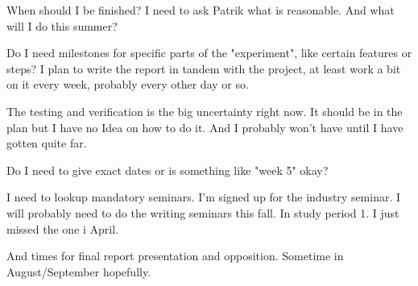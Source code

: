 \documentclass{scrartcl}
\begin{document}
When should I be finished? I need to ask Patrik what is reasonable. And what
will I do this summer?

Do I need milestones for specific parts of the "experiment", like certain
features or steps? I plan to write the report in tandem with the project, at
least work a bit on it every week, probably every other day or so.

The testing and verification is the big uncertainty right now. It should be in
the plan but I have no Idea on how to do it. And I probably won't have until
I have gotten quite far.

Do I need to give exact dates or is something like "week 5" okay?

I need to lookup mandatory seminars.
I'm signed up for the industry seminar.
I will probably need to do the writing seminars this fall. In study period 1.
I just missed the one i April.

And times for final report presentation and opposition.
Sometime in August/September hopefully.













\end{document}

